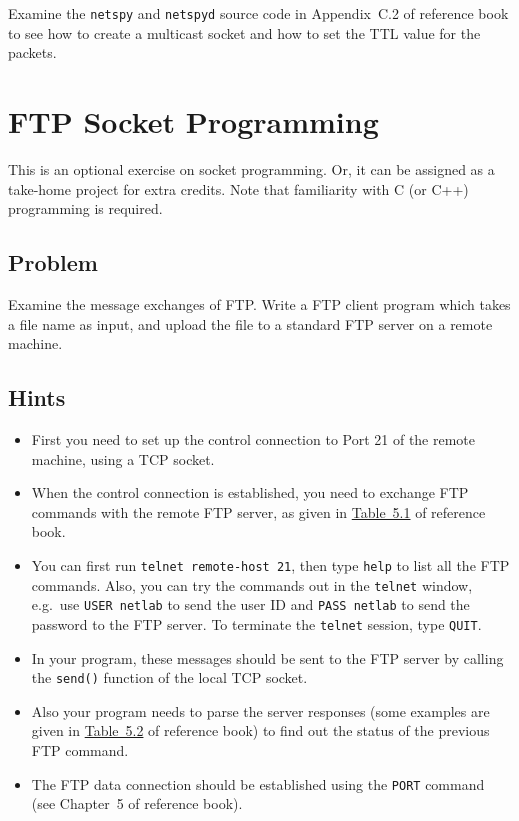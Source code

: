 \documentclass{../UTNetLab}
\begin{document}
    Examine the \lstinline{netspy} and \lstinline{netspyd} source code in Appendix~C.2 of reference book to see how to create a multicast socket and how to set the TTL value for the packets.
    

\section{FTP Socket Programming}
    This is an optional exercise on socket programming.
    Or, it can be assigned as a take-home project for extra credits.
    Note that familiarity with C (or C++) programming is required.

    \subsection*{Problem}
    Examine the message exchanges of FTP.
    Write a FTP client program which takes a file name as input, and upload the file to a standard FTP server on a remote machine.

    \subsection*{Hints}
    \begin{itemize}
        \item First you need to set up the control connection to Port 21 of the remote machine, using a TCP socket.
        \item When the control connection is established, you need to exchange FTP commands with the remote FTP server, as given in \hyperref[tab:5.1]{Table~5.1} of reference book.
        \item You can first run \lstinline{telnet remote-host 21}, then type \lstinline{help} to list all the FTP commands.
        Also, you can try the commands out in the \lstinline{telnet} window, e.g.\ use \lstinline{USER netlab} to send the user ID and \lstinline{PASS netlab} to send the password to the FTP server.
        To terminate the \lstinline{telnet} session, type \lstinline{QUIT}.
        \item In your program, these messages should be sent to the FTP server by calling the \lstinline{send()} function of the local TCP socket.
        \item Also your program needs to parse the server responses (some examples are given in \hyperref[tab:5.2]{Table~5.2} of reference book) to find out the status of the previous FTP command.
        \item The FTP data connection should be established using the \lstinline{PORT} command (see Chapter~5 of reference book).
    \end{itemize}
\end{document}
